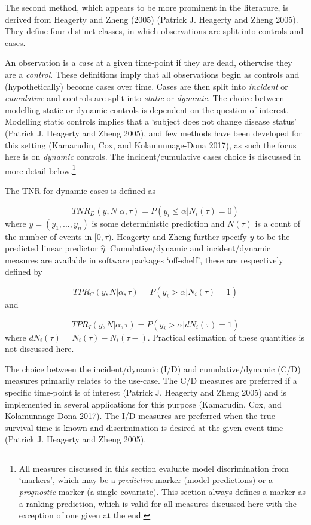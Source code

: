 \documentclass[
  letterpaper,
]{scrbook}
\theoremstyle{plain}
\theoremstyle{definition}
\theoremstyle{remark}
\begin{document}
The second method, which appears to be more prominent in the literature,
is derived from Heagerty and Zheng (2005) (Patrick J. Heagerty and Zheng
2005). They define four distinct classes, in which observations are
split into controls and cases.

An observation is a \emph{case} at a given time-point if they are dead,
otherwise they are a \emph{control}. These definitions imply that all
observations begin as controls and (hypothetically) become cases over
time. Cases are then split into \emph{incident} or \emph{cumulative} and
controls are split into \emph{static} or \emph{dynamic}. The choice
between modelling static or dynamic controls is dependent on the
question of interest. Modelling static controls implies that a `subject
does not change disease status' (Patrick J. Heagerty and Zheng 2005),
and few methods have been developed for this setting (Kamarudin, Cox,
and Kolamunnage-Dona 2017), as such the focus here is on \emph{dynamic}
controls. The incident/cumulative cases choice is discussed in more
detail below.\footnote{All measures discussed in this section evaluate
  model discrimination from `markers', which may be a \emph{predictive}
  marker (model predictions) or a \emph{prognostic} marker (a single
  covariate). This section always defines a marker as a ranking
  prediction, which is valid for all measures discussed here with the
  exception of one given at the end.}

The TNR for dynamic cases is defined as

\[
TNR_D(y, N | \alpha, \tau) = P(y_i \leq \alpha | N_i(\tau) = 0)
\] where \(y = (y_1,...,y_n)\) is some deterministic prediction and
\(N(\tau)\) is a count of the number of events in \([0,\tau)\). Heagerty
and Zheng further specify \(y\) to be the predicted linear predictor
\(\hat{\eta}\). Cumulative/dynamic and incident/dynamic measures are
available in software packages `off-shelf', these are respectively
defined by

\[
TPR_C(y, N | \alpha, \tau) = P(y_i > \alpha | N_i(\tau) = 1)
\] and

\[
TPR_I(y, N | \alpha, \tau) = P(y_i > \alpha | dN_i(\tau) = 1)
\] where \(dN_i(\tau) = N_i(\tau) - N_i(\tau-)\). Practical estimation
of these quantities is not discussed here.

The choice between the incident/dynamic (I/D) and cumulative/dynamic
(C/D) measures primarily relates to the use-case. The C/D measures are
preferred if a specific time-point is of interest (Patrick J. Heagerty
and Zheng 2005) and is implemented in several applications for this
purpose (Kamarudin, Cox, and Kolamunnage-Dona 2017). The I/D measures
are preferred when the true survival time is known and discrimination is
desired at the given event time (Patrick J. Heagerty and Zheng 2005).
\end{document}
